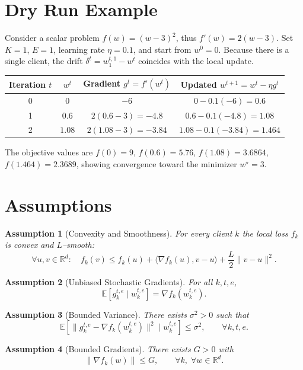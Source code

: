\documentclass[11pt]{article}
\newtheorem{assumption}{Assumption}
\newcommand{\E}{\mathbb{E}}
\newcommand{\R}{\mathbb{R}}
\begin{document}
\section*{Dry Run Example}
Consider a scalar problem $f(w)=(w-3)^{2}$, thus $f'(w)=2(w-3)$.  
Set $K=1$, $E=1$, learning rate $\eta=0.1$, and start from $w^{0}=0$.
Because there is a single client, the drift $\delta^{t}=w_{1}^{t,1}-w^{t}$ coincides with the local update.

\begin{center}
\begin{tabular}{c|c|c|c}
Iteration $t$ & $w^{t}$ & Gradient $g^{t}=f'(w^{t})$ & Updated $w^{t+1}=w^{t}-\eta g^{t}$\\ \hline
0 & $0$ & $-6$ & $0-0.1(-6)=0.6$\\
1 & $0.6$ & $2(0.6-3)=-4.8$ & $0.6-0.1(-4.8)=1.08$\\
2 & $1.08$ & $2(1.08-3)=-3.84$ & $1.08-0.1(-3.84)=1.464$\\
\end{tabular}
\end{center}
The objective values are $f(0)=9$, $f(0.6)=5.76$, $f(1.08)=3.6864$, $f(1.464)=2.3689$, showing convergence toward the minimizer $w^\star=3$.

\newpage
\section*{Assumptions}
\begin{assumption}[Convexity and Smoothness]\label{ass:conv-smooth}
For every client $k$ the local loss $f_k$ is convex and $L$–smooth:
\[
\forall u,v\in\R^{d}:\quad 
f_k(v)\le f_k(u)+\langle\nabla f_k(u),v-u\rangle
+\frac{L}{2}\|v-u\|^{2}.
\]
\end{assumption}

\begin{assumption}[Unbiased Stochastic Gradients]\label{ass:unbiased}
For all $k,t,e$,
\[
\E\!\left[g_{k}^{t,e}\mid w_{k}^{t,e}\right]=\nabla f_k\!\left(w_{k}^{t,e}\right).
\]
\end{assumption}

\begin{assumption}[Bounded Variance]\label{ass:var}
There exists $\sigma^{2}>0$ such that
\[
\E\!\left[\|g_{k}^{t,e}-\nabla f_k(w_{k}^{t,e})\|^{2}\mid w_{k}^{t,e}\right]\le\sigma^{2},
\qquad\forall k,t,e.
\]
\end{assumption}

\begin{assumption}[Bounded Gradients]\label{ass:bound}
There exists $G>0$ with
\[
\|\nabla f_k(w)\|\le G,\qquad\forall k,\;\forall w\in\R^{d}.
\]
\end{assumption}
\end{document}
